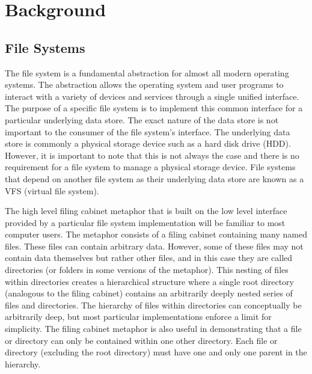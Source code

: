 \chapter{Background}
\vspace{1cm}

\section{File Systems}


The file system is a fundamental abstraction for almost all modern operating
systems. The abstraction allows the operating system and user programs to
interact with a variety of devices and services through a single unified
interface.
The purpose of a specific file system is to implement this common interface for
a particular underlying data store. The exact nature of the data store is not
important to the consumer of the file system's interface. The underlying data
store is commonly a physical storage device such as a hard disk drive (HDD).
However, it is important to note that this is not always the case and there is
no requirement for a file system to manage a physical storage device. File
systems that depend on another file system as their underlying data store are
known as a VFS (virtual file system).

The high level filing cabinet metaphor that is built on the low level interface
provided by a particular file system implementation will be familiar to most
computer users. The metaphor consists of a filing cabinet containing many named
files. These files can contain arbitrary data. However, some of these files may
not contain data themselves but rather other files, and in this case they are
called directories (or folders in some versions of the metaphor). This nesting
of files within directories creates a hierarchical structure where a single
root directory (analogous to the filing cabinet) contains an arbitrarily
deeply nested series of files and directories. The hierarchy of files within
directories can conceptually be arbitrarily deep, but most particular
implementations enforce a limit for simplicity. The filing cabinet metaphor is
also useful in demonstrating that a file or directory can only be contained
within one other directory. Each file or directory (excluding the root
directory) must have one and only one parent in the hierarchy.

